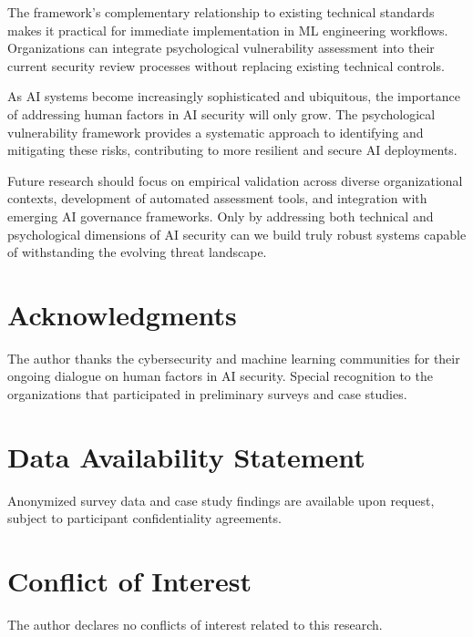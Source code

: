 \documentclass[11pt,a4paper]{article}
\begin{document}
The framework's complementary relationship to existing technical standards makes it practical for immediate implementation in ML engineering workflows. Organizations can integrate psychological vulnerability assessment into their current security review processes without replacing existing technical controls.

As AI systems become increasingly sophisticated and ubiquitous, the importance of addressing human factors in AI security will only grow. The psychological vulnerability framework provides a systematic approach to identifying and mitigating these risks, contributing to more resilient and secure AI deployments.

Future research should focus on empirical validation across diverse organizational contexts, development of automated assessment tools, and integration with emerging AI governance frameworks. Only by addressing both technical and psychological dimensions of AI security can we build truly robust systems capable of withstanding the evolving threat landscape.

\section*{Acknowledgments}

The author thanks the cybersecurity and machine learning communities for their ongoing dialogue on human factors in AI security. Special recognition to the organizations that participated in preliminary surveys and case studies.

\section*{Data Availability Statement}

Anonymized survey data and case study findings are available upon request, subject to participant confidentiality agreements.

\section*{Conflict of Interest}

The author declares no conflicts of interest related to this research.
\end{document}
